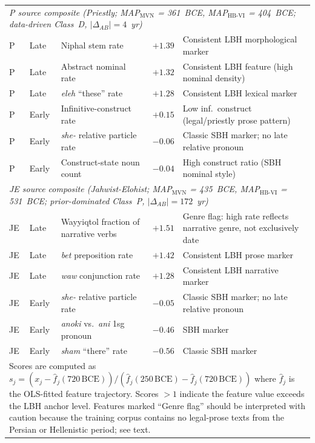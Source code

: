 \documentclass[10pt,letterpaper]{article}
\begin{document}
\begin{table}[!ht]
\begin{tabular}{llp{4.9cm}rp{5.1cm}}
\hline
\multicolumn{5}{p{15cm}}{\textit{P source composite (Priestly; MAP$_{\text{MVN}}$ = 361~BCE, MAP$_{\text{HB-VI}}$ = 404~BCE; data-driven Class~D, $|\Delta_{AB}|=4$~yr)}} \\
P & Late & Niphal stem rate                          & $+1.39$ & Consistent LBH morphological marker \\
P & Late & Abstract nominal rate                     & $+1.32$ & Consistent LBH feature (high nominal density) \\
P & Late & \textit{eleh} ``these'' rate           & $+1.28$ & Consistent LBH lexical marker \\
P & Early & Infinitive-construct rate                & $+0.15$ & Low inf.\ construct (legal/priestly prose pattern) \\
P & Early & \textit{she-} relative particle rate    & $-0.06$ & Classic SBH marker; no late relative pronoun \\
P & Early & Construct-state noun count               & $-0.04$ & High construct ratio (SBH nominal style) \\
\hline
\multicolumn{5}{p{15cm}}{\textit{JE source composite (Jahwist-Elohist; MAP$_{\text{MVN}}$ = 435~BCE, MAP$_{\text{HB-VI}}$ = 531~BCE; prior-dominated Class~P, $|\Delta_{AB}|=172$~yr)}} \\
JE & Late & Wayyiqtol fraction of narrative verbs    & $+1.51$ & Genre flag: high rate reflects narrative genre, not exclusively date \\
JE & Late & \textit{bet} preposition rate          & $+1.42$ & Consistent LBH prose marker \\
JE & Late & \textit{waw} conjunction rate          & $+1.28$ & Consistent LBH narrative marker \\
JE & Early & \textit{she-} relative particle rate   & $-0.05$ & Classic SBH marker; no late relative pronoun \\
JE & Early & \textit{anoki} vs.\ \textit{ani} 1sg pronoun & $-0.46$ & SBH marker \\
JE & Early & \textit{sham} ``there'' rate          & $-0.56$ & Classic SBH marker \\
\hline
\multicolumn{5}{p{15cm}}{\small Scores are computed as $s_j = (x_j - \hat{f}_j(720\,\text{BCE})) /
(\hat{f}_j(250\,\text{BCE}) - \hat{f}_j(720\,\text{BCE}))$ where $\hat{f}_j$ is the OLS-fitted
feature trajectory.  Scores $>1$ indicate the feature value exceeds the LBH anchor level.
Features marked ``Genre flag'' should be interpreted with caution because the training corpus
contains no legal-prose texts from the Persian or Hellenistic period; see text.} \\
\end{tabular}
\end{table}
\end{document}

